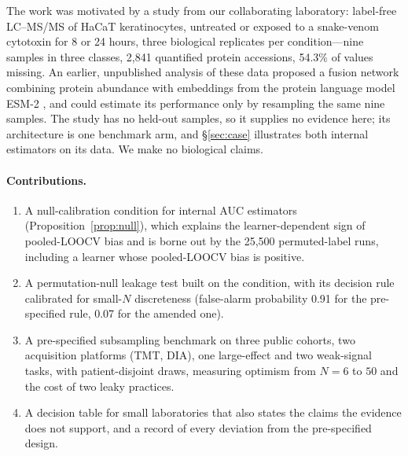 \documentclass[10pt,letterpaper]{article}
\begin{document}
The work was motivated by a study from our collaborating laboratory: label-free LC--MS/MS of HaCaT
keratinocytes, untreated or exposed to a snake-venom cytotoxin for 8 or 24 hours, three biological
replicates per condition---nine samples in three classes, 2,841 quantified protein accessions, 54.3\% of
values missing. An earlier, unpublished analysis of these data proposed a fusion network combining protein
abundance with embeddings from the protein language model ESM-2 \citep{lin2023esm2}, and could estimate its
performance only by resampling the same nine samples. The study has no held-out samples, so it supplies no
evidence here; its architecture is one benchmark arm, and \S\ref{sec:case} illustrates both internal
estimators on its data. We make no biological claims.

\paragraph{Contributions.}
\begin{enumerate}
  \item A null-calibration condition for internal AUC estimators (Proposition~\ref{prop:null}), which
        explains the learner-dependent sign of pooled-LOOCV bias and is borne out by the 25,500
        permuted-label runs, including a learner whose pooled-LOOCV bias is positive.
  \item A permutation-null leakage test built on the condition, with its decision rule calibrated for
        small-$N$ discreteness (false-alarm probability 0.91 for the pre-specified rule, 0.07 for the
        amended one).
  \item A pre-specified subsampling benchmark on three public cohorts, two acquisition platforms (TMT,
        DIA), one large-effect and two weak-signal tasks, with patient-disjoint draws, measuring optimism
        from $N = 6$ to $50$ and the cost of two leaky practices.
  \item A decision table for small laboratories that also states the claims the evidence does not support,
        and a record of every deviation from the pre-specified design.
\end{enumerate}
\end{document}
